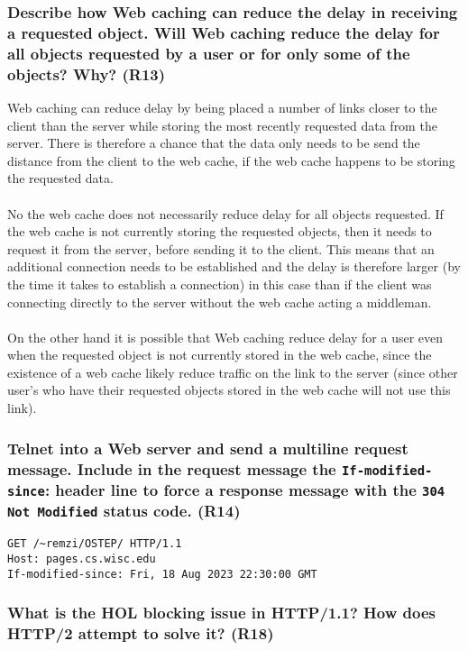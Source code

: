 \subsubsection{Describe how Web caching can reduce the delay in receiving a requested object. Will Web caching reduce the delay for all objects requested by a user or for only some of the objects? Why? (R13)}
Web caching can reduce delay by being placed a number of links closer to the client than the server while storing the most recently requested data from the server. There is therefore a chance that the data only needs to be send the distance from the client to the web cache, if the web cache happens to be storing the requested data. \\
\\
No the web cache does not necessarily  reduce delay for all objects requested. If the web cache is not currently storing the requested objects, then it needs to request it from the server, before sending it to the client. This means that an additional connection needs to be established and the delay is therefore larger (by the time it takes to establish a connection) in this case than if the client was connecting directly to the server without the web cache acting a middleman. \\
\\
On the other hand it is possible that Web caching reduce delay for a user even when the requested object is not currently stored in the web cache, since the existence of a web cache likely reduce traffic on the link to the server (since other user's who have their requested objects stored in the web cache will not use this link).


\subsubsection{Telnet into a Web server and send a multiline request message. Include in the request message the \texttt{If-modified-since}: header line to force a response message with the \texttt{304 Not Modified} status code. (R14)}
\begin{verbatim}
GET /~remzi/OSTEP/ HTTP/1.1
Host: pages.cs.wisc.edu
If-modified-since: Fri, 18 Aug 2023 22:30:00 GMT
\end{verbatim}


\subsubsection{What is the HOL blocking issue in HTTP/1.1? How does HTTP/2 attempt to solve it? (R18)}

